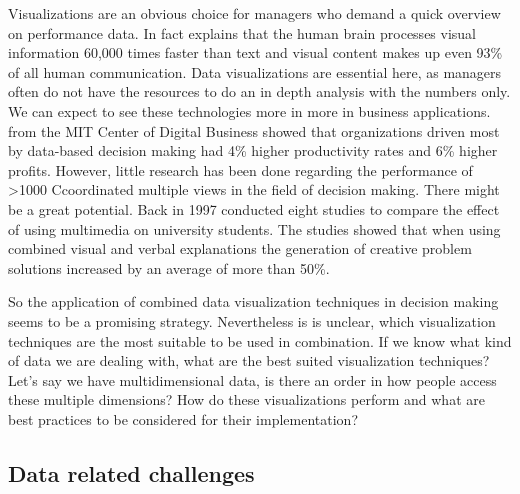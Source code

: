 \documentclass{article}
\newcommand\hmm[1]{\ifnum\ifhmode\spacefactor\else2000\fi>1000 \uppercase{#1}\else#1\fi}
\newcommand{\cmvs}{\hmm{c}oordinated multiple views}
\begin{document}
Visualizations are an obvious choice for managers who demand a quick overview on performance data.
In fact \textcite{Kusinitz2014} explains that the human brain processes visual information 60,000 times faster than text and visual content makes up even 93\% of all human communication.
Data visualizations are essential here, as managers often do not have the resources to do an in depth analysis with the numbers only.
We can expect to see these technologies more in more in business applications.
\textcite{McAfee2012} from the MIT Center of Digital Business showed that organizations driven most by data-based decision making had 4\% higher productivity rates and 6\% higher profits.
However, little research has been done regarding the performance of \cmvs{} in the field of decision making.
There might be a great potential.
Back in 1997 \textcite{Mayer1997} conducted eight studies to compare the effect of using multimedia on university students.
The studies showed that when using combined visual and verbal explanations the generation of creative problem solutions increased by an average of more than 50\%.

So the application of combined data visualization techniques in decision making seems to be a promising strategy.
Nevertheless is is unclear, which visualization techniques are the most suitable to be used in combination.
If we know what kind of data we are dealing with, what are the best suited visualization techniques?
Let's say we have multidimensional data, is there an order in how people access these multiple dimensions?
How do these visualizations perform and what are best practices to be considered for their implementation?

\subsection{Data related challenges}
\end{document}
